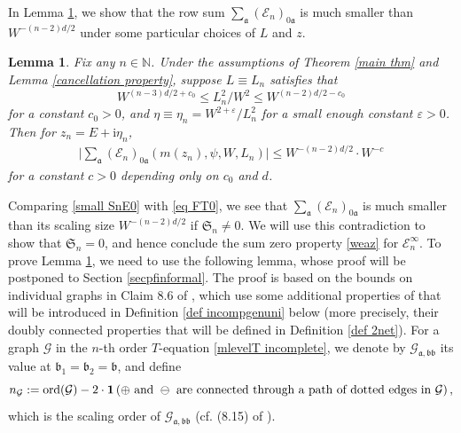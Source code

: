\documentclass{article}
\newcommand{\1}{\mathds{1}}
\numberwithin{equation}{section}
\newcommand{\ord}{{\rm{ord}}}
\newcommand{\be}{\begin{equation}}
\newcommand{\ee}{\end{equation}}
\newcommand{\e}{{\varepsilon}}
\newcommand{\fa}{{\mathfrak a}}
\newcommand{\fb}{{\mathfrak b}}
\renewcommand{\cal}{\mathcal}
\newcommand{\ii}{\mathrm{i}} %
\renewcommand{\leq}{\leqslant}
\renewcommand{\geq}{\geqslant}
\renewcommand{\le}{\leq}
\renewcommand{\ge}{\geq}
\newcommand{\N}{\mathbb{N}}
\newcommand{\Z}{\mathbb{Z}}
\theoremstyle{plain} %
\newtheorem{lemma}[theorem]{Lemma}
\theoremstyle{remark}
\newcommand{\Sele}{{\mathcal E}}
\newcommand{\Seleinf}{{\mathcal E}^{\infty}}
\newcommand{\Sint}{\mathfrak S}
\newcommand{\incomp}{{\text{$T$-equation}}}
\newcommand{\PITn}{{\mathcal R_{IT}^{(n)}}}
\newcommand{\AITn}{{\mathcal A_{IT}^{(>n)}}}
\newcommand{\Err}{{\mathcal Err}}
\begin{document}
In Lemma \ref{lem maincancel}, we show that the row sum $\sum_{\fa} ( \Sele_n)_{0\fa}$ is much smaller than $W^{-(n-2)d/2}$ under some particular choices of $L$ and $z$. 



\begin{lemma}\label{lem maincancel}
Fix any $n\in \N$. Under the assumptions of Theorem \ref{main thm} and Lemma \ref{cancellation property}, suppose $L\equiv L_n$ satisfies that
\be\label{Lcondition} W^{(n-3)d/2+c_0} \le {L_n^2}/{W^2}  \le W^{(n-2)d/2-c_0} \ee
for a constant $c_0>0$, and $\eta\equiv \eta_n=W^{2+\e}/L_n^2$ for a small enough constant $\e>0$. Then  for $z_n= E+\ii \eta_n$,  %
\be\label{small SnE0}
\begin{split}
\Big| \sum_{\fa} (\Sele_n)_{0\fa } \left(m(z_n),\psi, W, L_n\right) \Big|\le W^{-(n -2)d/2}\cdot W^{-c} 
\end{split}
\ee
for a constant $c>0$ depending only on $c_0$ and $d$.
\end{lemma}



Comparing \eqref{small SnE0} with \eqref{eq FT0}, we see that $\sum_{\fa} (\Sele_n)_{0\fa}$ is much smaller than its scaling size $W^{-(n-2)d/2}$ if $\Sint_n\ne 0$. We will use this contradiction to show that $\Sint_n=0$, and hence conclude the sum zero property \eqref{weaz} for $\Seleinf_n$. To prove Lemma \ref{lem maincancel}, we need to use the following lemma, whose proof will be postponed to Section \ref{secpfinformal}. The proof is based on the bounds on individual graphs in Claim 8.6 of \cite{PartII_high}, which use some additional properties of \smash{$\PITn$, $\AITn$ and $\Err_{n,D}'$} that will be introduced in Definition \ref{def incompgenuni} below (more precisely, their doubly connected properties that will be defined in Definition \ref{def 2net}). For a graph $\cal G$ in the $n$-th order $\incomp$ \eqref{mlevelT incomplete}, we denote by $\cal G_{\fa,\fb\fb}$ its value at $\fb_1=\fb_2=\fb$, and define
$$n_{\cal G}:=\ord(\cal G)-2\cdot \mathbf 1\left(\oplus \text{ and } \ominus \text{ are connected through a path of dotted edges in }\cal G\right),$$
which is the scaling order of $\cal G_{\fa,\fb\fb}$ (cf. (8.15) of \cite{PartII_high}).
\end{document}
